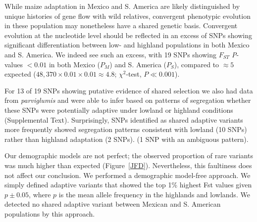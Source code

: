 {{While maize adaptation in Mexico and S. America are likely distinguished by unique histories of gene flow with wild relatives, convergent phenotypic evolution in these population may nonetheless have a shared genetic basis.   
Convergent evolution at the nucleotide level should be reflected in an excess of SNPs showing significant differentiation between low- and highland populations in both Mexico and S. America. 
We indeed see such an excess, with 19 SNPs showing $F_{ST}$ \emph{P}-values  $<0.01$ in both Mexico ($P_M$) and S. America ($P_S$), compared to $\approx 5$ expected ($48,370\times 0.01 \times 0.01 \approx 4.8$; $\chi^2$-test, $P\ll0.001$).


For 13 of 19 SNPs showing putative evidence of shared selection we also had data from \textit{parviglumis} and were able to infer based on patterns of segregation whether these SNPs were potentially adaptive under lowland or highland conditions (Supplemental Text).  
Surprisingly, SNPs identified as shared adaptive variants more frequently showed segregation patterns consistent with lowland  (10 SNPs) rather than highland adaptation (2 SNPs). (1 SNP with an ambiguous pattern). 


Our demographic models are not perfect; the observed proportion of rare variants was much higher than expected (Figure~\ref{JFD}).
Nevertheless, this faultiness does not affect our conclusion.
We performed a demographic model-free approach.
We simply defined adaptive variants that showed the top 1\% highest Fst values given $p\pm 0.05$, where $p$ is the mean allele frequency in the highlands and lowlands.
We detected no shared adaptive variant between Mexican and S. American populations by this approach.

}}
